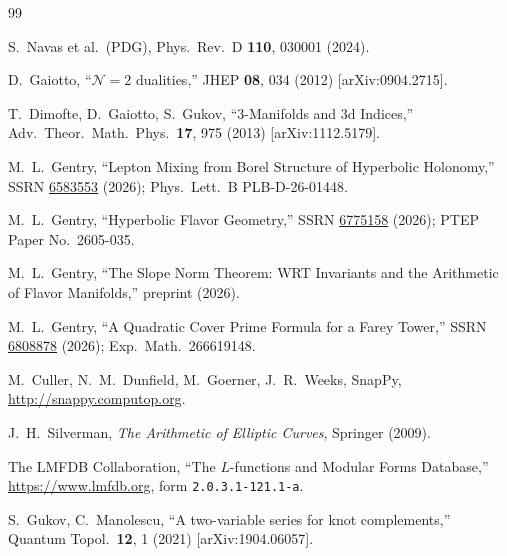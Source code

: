 \documentclass[11pt,a4paper]{article}
\theoremstyle{remark}
\begin{document}
\begin{thebibliography}{99}

S.~Navas et al.\ (PDG), Phys.\ Rev.\ D \textbf{110}, 030001 (2024).

D.~Gaiotto, ``$\mathcal{N}=2$ dualities,''
JHEP \textbf{08}, 034 (2012) [arXiv:0904.2715].

T.~Dimofte, D.~Gaiotto, S.~Gukov,
``3-Manifolds and 3d Indices,''
Adv.\ Theor.\ Math.\ Phys.\ \textbf{17}, 975 (2013) [arXiv:1112.5179].

M.~L.~Gentry,
``Lepton Mixing from Borel Structure of Hyperbolic Holonomy,''
SSRN \href{https://doi.org/10.2139/ssrn.6583553}{6583553} (2026);
Phys.\ Lett.\ B PLB-D-26-01448.

M.~L.~Gentry,
``Hyperbolic Flavor Geometry,''
SSRN \href{https://doi.org/10.2139/ssrn.6775158}{6775158} (2026);
PTEP Paper No.\ 2605-035.

M.~L.~Gentry,
``The Slope Norm Theorem: WRT Invariants and the Arithmetic
of Flavor Manifolds,'' preprint (2026).

M.~L.~Gentry,
``A Quadratic Cover Prime Formula for a Farey Tower,''
SSRN \href{https://doi.org/10.2139/ssrn.6808878}{6808878} (2026);
Exp.\ Math.\ 266619148.

M.~Culler, N.~M.~Dunfield, M.~Goerner, J.~R.~Weeks,
SnapPy, \url{http://snappy.computop.org}.

J.~H.~Silverman,
\emph{The Arithmetic of Elliptic Curves},
Springer (2009).

The LMFDB Collaboration,
``The $L$-functions and Modular Forms Database,''
\url{https://www.lmfdb.org},
form \texttt{2.0.3.1-121.1-a}.

S.~Gukov, C.~Manolescu,
``A two-variable series for knot complements,''
Quantum Topol.\ \textbf{12}, 1 (2021) [arXiv:1904.06057].

\end{thebibliography}
\end{document}
